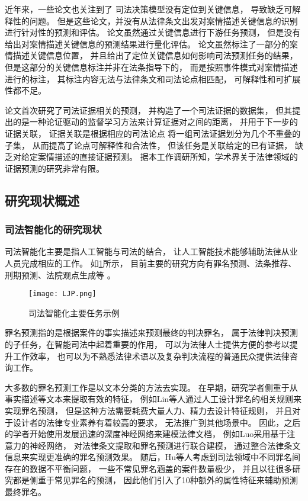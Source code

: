 近年来，一些论文也关注到了
司法决策模型没有定位到关键信息，
导致缺乏可解释性的问题。
但是这些论文，并没有从法律条文出发对案情描述关键信息的识别
进行针对性的预测和评估。
论文虽然通过关键信息进行下游任务预测，
但是没有给出对案情描述关键信息的预测结果进行量化评估。
论文虽然标注了一部分的案情描述关键信息位置，
并且给出了定位关键信息如何影响司法预测任务的结果，
但是这部分的关键信息标注并非在法条指导下的，
而是按照事件模式对案情描述进行的标注，
其标注内容无法与法律条文和司法论点相匹配，
可解释性和可扩展性都不足。

论文首次研究了司法证据相关的预测，
并构造了一个司法证据的数据集，
但其提出的是一种论证驱动的监督学习方法来计算证据对之间的距离，
并用于下一步的证据关联，
证据关联是根据相应的司法论点
将一组司法证据划分为几个不重叠的子集，
从而提高了论点可解释性和合法性，
但该任务是关联给定的已有证据，
缺乏对给定案情描述的直接证据预测。
据本工作调研所知，学术界关于法律领域的证据预测的研究非常有限。


\subsection{研究现状概述}
\subsubsection{司法智能化的研究现状}

司法智能化主要是指人工智能与司法的结合，
让人工智能技术能够辅助法律从业人员完成相应的工作。
如\cref{LJP}所示，
目前主要的研究方向有罪名预测、法条推荐、刑期预测、法院观点生成等
。

\begin{figure}[h]
	\centering
	\texttt{[image: LJP.png]}
	\caption{司法智能化主要任务示例}
	\label{LJP}
\end{figure}

罪名预测指的是根据案件的事实描述来预测最终的判决罪名，
属于法律判决预测的子任务，在智能司法中起着重要的作用，
可以为法律人士提供方便的参考以提升工作效率，
也可以为不熟悉法律术语以及复杂判决流程的普通民众提供法律咨询工作。

大多数的罪名预测工作是以文本分类的方法去实现。
在早期，研究学者侧重于从事实描述等文本来提取有效的特征，
例如Lin等人通过人工设计罪名的相关规则来实现罪名预测，
但是这种方法需要耗费大量人力、精力去设计特征规则，
并且对于设计者的法律专业素养有着较高的要求，
无法推广到其他场景中。
因此，之后的学者开始使用发展迅速的深度神经网络来建模法律文档，
例如Luo采用基于注意力的神经网络，
对法律条文提取和罪名预测进行联合建模，
通过整合法律条文信息来实现更准确的罪名预测效果。
随后，Hu等人考虑到司法领域中不同罪名间存在的数据不平衡问题，
一些不常见罪名涵盖的案件数量极少，
并且以往很多研究都是侧重于常见罪名的预测，
因此他们引入了10种额外的属性特征来辅助预测最终罪名。

